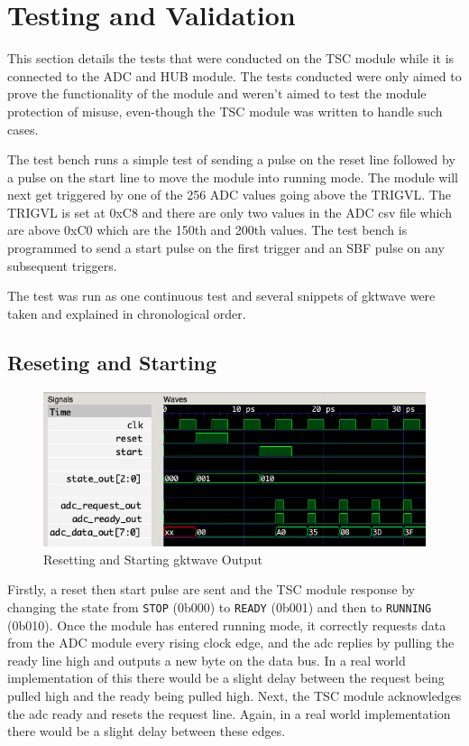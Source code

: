 \section{Testing and Validation}
This section details the tests that were conducted on the TSC module while it is connected to the ADC and HUB module.
The tests conducted were only aimed to prove the functionality of the module and weren't aimed to test the module protection of misuse, even-though the TSC module was written to handle such cases.

The test bench runs a simple test of sending a pulse on the reset line followed by a pulse on the start line to move the module into running mode.
The module will next get triggered by one of the 256 ADC values going above the TRIGVL.
The TRIGVL is set at 0xC8 and there are only two values in the ADC csv file which are above 0xC0 which are the 150th and 200th values.
The test bench is programmed to send a start pulse on the first trigger and an SBF pulse on any subsequent triggers.

The test was run as one continuous test and several snippets of gktwave were taken and explained in chronological order.

\subsection{Reseting and Starting}
\begin{figure}[H]
    \centering
    \includegraphics[width=\columnwidth]{Figures/Areset_start_adc}
    \caption{Resetting and Starting gktwave Output}
    \label{fig:testA}
\end{figure}

Firstly, a reset then start pulse are sent and the TSC module response by changing the state from \texttt{STOP} (0b000) to \texttt{READY} (0b001) and then to \texttt{RUNNING} (0b010).
Once the module has entered running mode, it correctly requests data from the ADC module every rising clock edge, and the adc replies by pulling the ready line high and outputs a new byte on the data bus.
In a real world implementation of this there would be a slight delay between the request being pulled high and the ready being pulled high.
Next, the TSC module acknowledges the adc ready and resets the request line.
Again, in a real world implementation there would be a slight delay between these edges.

